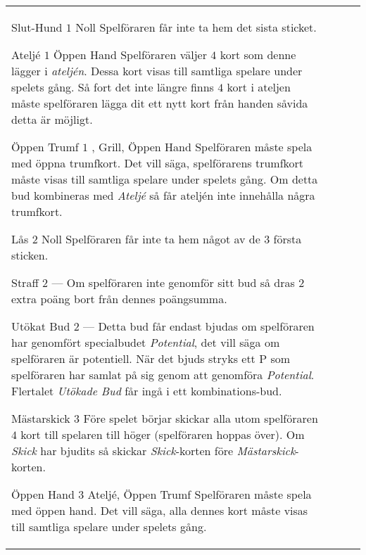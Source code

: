 \begin{table}
\begin{center}
\begin{tabularx}{\textwidth}{lcp{3cm}|X}
			\specialBidItem%
			{Slut-Hund}
			{$1$}
			{Noll}
			{%
				Spelföraren får inte ta hem det sista sticket.
			}

			\specialBidItem%
			{Ateljé}
			{$1$}
			{Öppen Hand}
			{%
				Spelföraren väljer $4$ kort som denne lägger i \emph{ateljén}. Dessa kort visas till samtliga spelare under spelets gång. Så fort det inte längre finns $4$ kort i ateljen måste spelföraren lägga dit ett nytt kort från handen såvida detta är möjligt.
			}

			\specialBidItem%
			{Öppen Trumf}
			{$1$}
			{\nonTrump, Grill, Öppen Hand}
			{%
				Spelföraren måste spela med öppna trumfkort. Det vill säga, spelförarens trumfkort måste visas till samtliga spelare under spelets gång. Om detta bud kombineras med \emph{Ateljé} så får ateljén inte innehålla några trumfkort.
			}

			\specialBidItem%
			{Lås}
			{$2$}
			{Noll}
			{%
				Spelföraren får inte ta hem något av de $3$ första sticken.
			}

			\specialBidItem%
			{Straff}
			{$2$}
			{---}
			{%
				Om spelföraren inte genomför sitt bud så dras $2$ extra poäng bort från dennes poängsumma.
			}

			\specialBidItem%
			{Utökat Bud}
			{$2$}
			{---}
			{%
				Detta bud får endast bjudas om spelföraren har genomfört specialbudet \emph{Potential}, det vill säga om spelföraren är potentiell. När det bjuds stryks ett P som spelföraren har samlat på sig genom att genomföra \emph{Potential}. Flertalet \emph{Utökade Bud} får ingå i ett kombinations-bud.
			}

			\specialBidItem%
			{Mästarskick}
			{$3$}
			{\nonTrump}
			{%
				Före spelet börjar skickar alla utom spelföraren $4$ kort till spelaren till höger (spelföraren hoppas över). Om \emph{Skick} har bjudits så skickar \emph{Skick}-korten före \emph{Mästarskick}-korten.
			}

			\specialBidItem%
			{Öppen Hand}
			{$3$}
			{Ateljé, Öppen Trumf}
			{%
				Spelföraren måste spela med öppen hand. Det vill säga, alla dennes kort måste visas till samtliga spelare under spelets gång.
			}
		\end{tabularx}
	\end{center}
\end{table}
